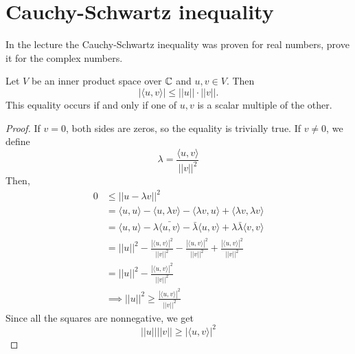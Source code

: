 \section{Cauchy-Schwartz inequality}
	In the lecture the Cauchy-Schwartz inequality was proven for real numbers, prove it for the complex numbers.
	\begin{theorem}
	\label{cauchy-schwartz}
	Let $V$ be an inner product space over \(\mathbb{C}\) and \(u,v\in V\). Then
	\[ |\langle u,v\rangle| \leq ||u|| \cdot ||v||. \]
	This equality occurs if and only if one of \(u,v\) is a scalar multiple of the other.
	\end{theorem}
	\begin{proof}
	If \(v=0\), both sides are zeros, so the equality is trivially true.
	If \(v\neq0\), we define
	\[\lambda=\frac{\langle u,v\rangle}{||v||^2}  \]
	Then,
	\begin{align*}
	0&\leq ||u-\lambda v||^2\\
	&=\langle u,u \rangle-\langle u,\lambda v\rangle-\langle\lambda v,u \rangle+\langle \lambda v,\lambda v\rangle\\
	&=\langle u,u \rangle-\lambda\bar{\langle u,v \rangle}-\bar\lambda\langle u,v \rangle+\lambda\bar\lambda \langle v,v \rangle\\
	&=||u||^2-\frac{|\langle u,v \rangle|^2}{||v||^2}-\frac{|\langle u,v \rangle|^2}{||v||^2}+\frac{|\langle u,v \rangle|^2}{||v||^2}\\
	&=||u||^2-\frac{|\langle u,v \rangle|^2}{||v||^2}\\
	&\implies ||u||^2\geq\frac{|\langle u,v \rangle|^2}{||v||^2} 
	\end{align*}
	Since all the squares are nonnegative, we get
	\[||u||||v||\geq |\langle u,v \rangle|^2 \]
	\end{proof}


